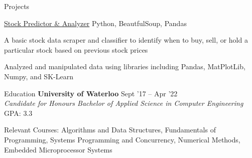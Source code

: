 \documentclass{resume} %
\newcommand{\ExternalLink}{%
    \tikz[x=1.2ex, y=1.2ex, baseline=-0.05ex]{%
        \begin{scope}[x=1ex, y=1ex]
            \clip (-0.1,-0.1) 
                --++ (-0, 1.2) 
                --++ (0.6, 0) 
                --++ (0, -0.6) 
                --++ (0.6, 0) 
                --++ (0, -1);
            \path[draw, 
                line width = 0.5, 
                rounded corners=0.5] 
                (0,0) rectangle (1,1);
        \end{scope}
        \path[draw, line width = 0.5] (0.5, 0.5) 
            -- (1, 1);
        \path[draw, line width = 0.5] (0.6, 1) 
            -- (1, 1) -- (1, 0.6);
        }
    }
\begin{document}
\begin{rSection}{Projects}

  \begin{rWorkSection}{\href{https://github.com/tharseken/Stock-Predictor-and-Analyzer}{Stock Predictor \& Analyzer}}
                      {}
                      {Python, BeautfulSoup, Pandas}
                      {}
    \item A basic stock data scraper and classifier to identify when to buy, sell, or hold a particular stock based on previous stock prices
    \item Analyzed and manipulated data using libraries including Pandas, MatPlotLib, Numpy, and SK-Learn
  
  \end{rWorkSection}
  
  \vspace{-0.1em}

  \end{rSection}


\begin{rSection}{Education}
  {\bf University of Waterloo} \hfill {Sept '17 -- Apr '22}\\
  {\em Candidate for Honours Bachelor of Applied Science in Computer Engineering} \hfill {GPA: 3.3}\\
\end{rSection}
\vspace{-1.25em}
\normalsize{Relevant Courses: Algorithms and Data Structures, Fundamentals of Programming, Systems Programming and Concurrency, Numerical Methods, Embedded
Microprocessor Systems}
\end{document}
